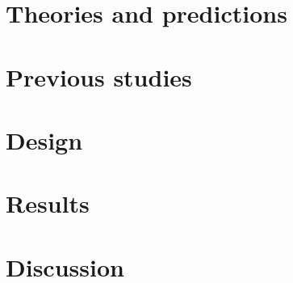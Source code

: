 \documentclass[fleqn,reqno,10pt,draft]{article}
\begin{document}
\newpage

\section{Theories and predictions}
\label{sec:theories-predictions}

\lipsum[1]

\section{Previous studies}
\label{sec:previous-studies}

\lipsum[1]

\section{Design}
\label{sec:design}

\lipsum[1]

\section{Results}
\label{sec:results}

\lipsum[1]

\section{Discussion}
\label{sec:discussion}

\lipsum[1]





\printbibliography[heading=bibintoc]
\end{document}

